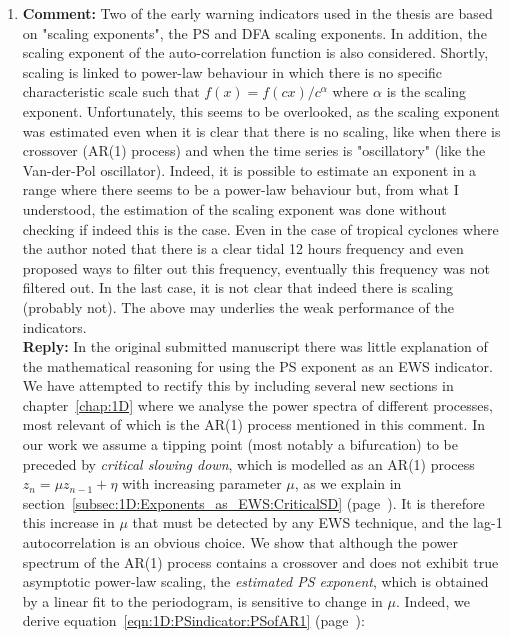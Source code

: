 \begin{enumerate}
	\item  {\bf Comment:} Two of the early warning indicators used in the thesis are based on "scaling exponents", the PS and DFA scaling exponents. In addition, the scaling exponent of the auto-correlation function is also considered. Shortly, scaling is linked to power-law behaviour in which there is no specific characteristic scale such that $f(x)=f(cx)/c^\alpha$ where $\alpha$ is the scaling exponent. Unfortunately, this seems to be overlooked, as the scaling exponent was estimated even when it is clear that there is no scaling, like when there is crossover (AR(1) process) and when the time series is "oscillatory" (like the Van-der-Pol oscillator). Indeed, it is possible to estimate an exponent in a range where there seems to be a power-law behaviour but, from what I understood, the estimation of the scaling exponent was done without checking if indeed this is the case. Even in the case of tropical cyclones where the author noted that there is a clear tidal 12 hours frequency and even proposed ways to filter out this frequency, eventually this frequency was not filtered out. In the last case, it is not clear that indeed there is scaling (probably not). The above may underlies the weak performance of the indicators.\\
	{\bf Reply:} In the original submitted manuscript there was little explanation of the mathematical reasoning for using the PS exponent as an EWS indicator. We have attempted to rectify this by including several new sections in chapter~\ref{chap:1D} where we analyse the power spectra of different processes, most relevant of which is the AR(1) process mentioned in this comment. In our work we assume a tipping point (most notably a bifurcation) to be preceded by \emph{critical slowing down}, which is modelled as an AR(1) process $z_{n} = \mu z_{n-1} + \eta$ with increasing parameter $\mu$, as we explain in section~\ref{subsec:1D:Exponents_as_EWS:CriticalSD} (page~\pageref{subsec:1D:Exponents_as_EWS:CriticalSD}). It is therefore this increase in $\mu$ that must be detected by any EWS technique, and the lag-1 autocorrelation is an obvious choice. We show that although the power spectrum of the AR(1) process contains a crossover and does not exhibit true asymptotic power-law scaling, the \emph{estimated PS exponent}, which is obtained by a linear fit to the periodogram, is sensitive to change in $\mu$. Indeed, we derive equation~\ref{eqn:1D:PSindicator:PSofAR1} (page~\pageref{eqn:1D:PSindicator:PSofAR1}):
	\begin{equation*}

\end{equation*}
\end{enumerate}
